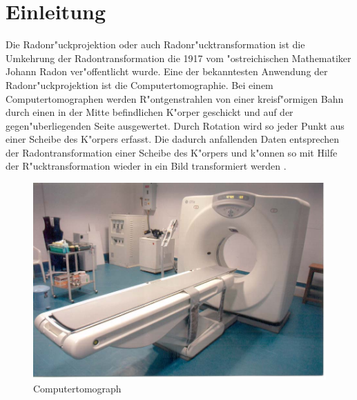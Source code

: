 \section{Einleitung}
Die Radonr"uckprojektion oder auch Radonr"ucktransformation ist
die Umkehrung der Radontransformation die 1917 vom "ostreichischen
Mathematiker Johann Radon ver"offentlicht wurde. Eine der bekanntesten
Anwendung der Radonr"uckprojektion ist die Computertomographie. Bei einem
Computertomographen werden R"ontgenstrahlen von einer kreisf"ormigen
Bahn durch einen in der Mitte befindlichen K"orper geschickt und auf
der gegen"uberliegenden Seite ausgewertet. Durch Rotation wird so jeder
Punkt aus einer Scheibe des K"orpers erfasst. Die dadurch anfallenden
Daten entsprechen der Radontransformation einer Scheibe des K"orpers
und k"onnen so mit Hilfe der R"ucktransformation wieder in ein Bild
transformiert werden
\cite{wikiRadontransform}.

\begin{figure}[ht!]\centering
	\begin{adjustbox}{scale=0.5, keepaspectratio}
		\includegraphics{radon/images/tomograph.jpg}
	\end{adjustbox}
	\caption{Computertomograph \cite{computertomographBild}}
\end{figure}
